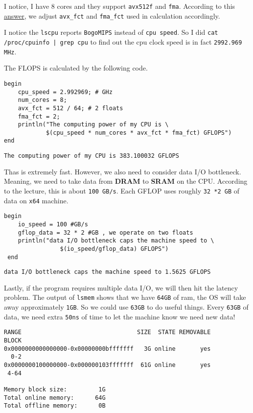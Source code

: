 \documentclass[11pt]{article}
\begin{document}
I notice, I have \(8\) cores and they support \texttt{avx512f} and \texttt{fma}. According to
this \href{https://stackoverflow.com/a/59146690}{answer}, we adjust \texttt{avx\_fct} and \texttt{fma\_fct} used in calculation accordingly.

I notice the \texttt{lscpu} reports \texttt{BogoMIPS} instead of \texttt{cpu speed}. So I did \texttt{cat
/proc/cpuinfo | grep cpu} to find out the cpu clock speed is in fact \texttt{2992.969
MHz}.

The FLOPS is calculated by the following code.
\begin{verbatim}
begin
    cpu_speed = 2.992969; # GHz
    num_cores = 8;
    avx_fct = 512 / 64; # 2 floats
    fma_fct = 2;
    println("The computing power of my CPU is \
            $(cpu_speed * num_cores * avx_fct * fma_fct) GFLOPS")
end
\end{verbatim}

\begin{verbatim}
The computing power of my CPU is 383.100032 GFLOPS
\end{verbatim}


Thas is extremely fast. However, we also need to consider data I/O bottleneck.
Meaning, we need to take data from \textbf{DRAM} to \textbf{SRAM} on the CPU. According to the
lecture, this is about \texttt{100 GB/s}. Each GFLOP uses roughly \texttt{32 *2 GB} of data on
\texttt{x64} machine.

\begin{verbatim}
begin
    io_speed = 100 #GB/s
    gflop_data = 32 * 2 #GB , we operate on two floats
    println("data I/O bottleneck caps the machine speed to \
                $(io_speed/gflop_data) GFLOPS")
 end
\end{verbatim}

\begin{verbatim}
data I/O bottleneck caps the machine speed to 1.5625 GFLOPS
\end{verbatim}


Lastly, if the program requires multiple data I/O, we will then hit the latency
problem. The output of \texttt{lsmem} shows that we have \texttt{64GB} of ram, the OS will
take away approximately \texttt{1GB}. So we could use \texttt{63GB} to do useful things. Every
\texttt{63GB} of data, we need extra \texttt{50ns} of time to let the machine know we need new
data!
\begin{verbatim}
RANGE                                 SIZE  STATE REMOVABLE 
BLOCK
0x0000000000000000-0x00000000bfffffff   3G online       yes 
  0-2
0x0000000100000000-0x000000103fffffff  61G online       yes 
 4-64

Memory block size:         1G
Total online memory:      64G
Total offline memory:      0B
\end{verbatim}
\end{document}
